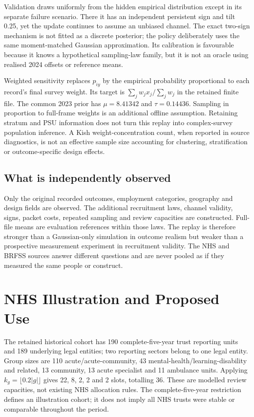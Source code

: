 Validation draws uniformly from the hidden empirical distribution except in its separate failure scenario. There it has an independent persistent sign and tilt 0.25, yet the update continues to assume an unbiased channel. The exact two-sign mechanism is not fitted as a discrete posterior; the policy deliberately uses the same moment-matched Gaussian approximation. Its calibration is favourable because it knows a hypothetical sampling-law family, but it is not an oracle using realised 2024 offsets or reference means.

Weighted sensitivity replaces $p_{iy}$ by the empirical probability proportional to each record's final survey weight. Its target is $\sum_jw_jx_j/\sum_jw_j$ in the retained finite file. The common 2023 prior has $\mu=8.41342$ and $\tau=0.14436$. Sampling in proportion to full-frame weights is an additional offline assumption. Retaining stratum and PSU information does not turn this replay into complex-survey population inference. A Kish weight-concentration count, when reported in source diagnostics, is not an effective sample size accounting for clustering, stratification or outcome-specific design effects.

\subsection{What is independently observed}
Only the original recorded outcomes, employment categories, geography and design fields are observed. The additional recruitment laws, channel validity, signs, packet costs, repeated sampling and review capacities are constructed. Full-file means are evaluation references within those laws. The replay is therefore stronger than a Gaussian-only simulation in outcome realism but weaker than a prospective measurement experiment in recruitment validity. The NHS and BRFSS sources answer different questions and are never pooled as if they measured the same people or construct.

\section{NHS Illustration and Proposed Use}
The retained historical cohort has 190 complete-five-year trust reporting units and 189 underlying legal entities; two reporting sectors belong to one legal entity. Group sizes are 110 acute/acute-community, 43 mental-health/learning-disability and related, 13 community, 13 acute specialist and 11 ambulance units. Applying $k_g=\lfloor0.2|g|\rfloor$ gives 22, 8, 2, 2 and 2 slots, totalling 36. These are modelled review capacities, not existing NHS allocation rules. The complete-five-year restriction defines an illustration cohort; it does not imply all NHS trusts were stable or comparable throughout the period.

